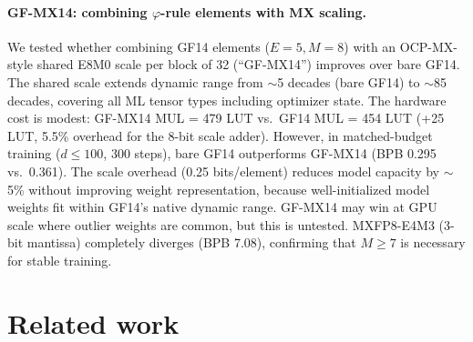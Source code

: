 \documentclass[11pt]{article}
\begin{document}
\paragraph{GF-MX14: combining $\varphi$-rule elements with MX scaling.}
We tested whether combining GF14 elements ($E{=}5, M{=}8$) with an OCP-MX-style
shared E8M0 scale per block of 32 (``GF-MX14'') improves over bare GF14.
The shared scale extends dynamic range from $\sim$5 decades (bare GF14) to
$\sim$85 decades, covering all ML tensor types including optimizer state.
The hardware cost is modest: GF-MX14 MUL = 479 LUT vs.\ GF14 MUL = 454 LUT
(+25 LUT, 5.5\% overhead for the 8-bit scale adder). However, in matched-budget
training ($d \leq 100$, 300 steps), bare GF14 outperforms GF-MX14
(BPB 0.295 vs.\ 0.361). The scale overhead (0.25 bits/element) reduces model
capacity by $\sim$5\% without improving weight representation, because
well-initialized model weights fit within GF14's native dynamic range.
GF-MX14 may win at GPU scale where outlier weights are common, but this
is untested. MXFP8-E4M3 (3-bit mantissa) completely diverges (BPB 7.08),
confirming that $M \geq 7$ is necessary for stable training.

\section{Related work}\label{sec:related}
\end{document}
